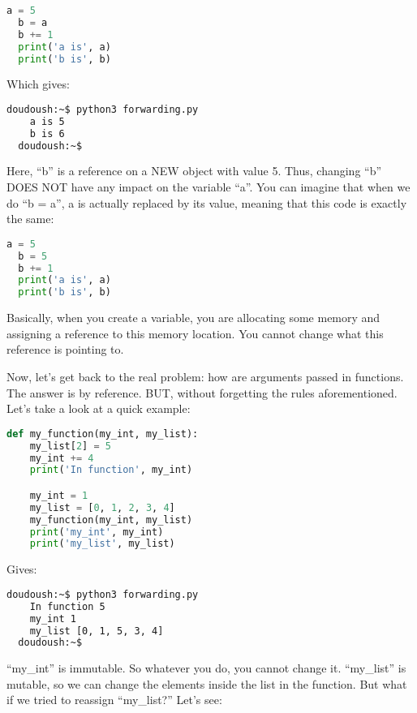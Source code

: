 \begin{lstlisting}[language=python]
  a = 5
  b = a
  b += 1
  print('a is', a)
  print('b is', b)
\end{lstlisting}

Which gives:

\begin{lstlisting}[language=bash]
  doudoush:~$ python3 forwarding.py
    a is 5
    b is 6
  doudoush:~$
\end{lstlisting}

Here, ``b'' is a reference on a NEW object with value 5. Thus, changing ``b'' DOES NOT have any impact
on the variable ``a''. You can imagine that when we do ``b = a'', a is actually replaced by its value,
meaning that this code is exactly the same:

\begin{lstlisting}[language=python]
  a = 5
  b = 5
  b += 1
  print('a is', a)
  print('b is', b)
\end{lstlisting}

Basically, when you create a variable, you are allocating some memory and assigning a reference
to this memory location. You cannot change what this reference is pointing to.

\vspace{5mm}
Now, let's get back to the real problem: how are arguments passed in functions. The answer is by reference.
BUT, without forgetting the rules aforementioned. Let's take a look at a quick example:

\begin{lstlisting}[language=python]
  def my_function(my_int, my_list):
    my_list[2] = 5
    my_int += 4
    print('In function', my_int)

    my_int = 1
    my_list = [0, 1, 2, 3, 4]
    my_function(my_int, my_list)
    print('my_int', my_int)
    print('my_list', my_list)
\end{lstlisting}

Gives:

\begin{lstlisting}[language=bash]
  doudoush:~$ python3 forwarding.py
    In function 5
    my_int 1
    my_list [0, 1, 5, 3, 4]
  doudoush:~$
\end{lstlisting}

``my\_int'' is immutable. So whatever you do, you cannot change it. ``my\_list'' is mutable,
so we can change the elements inside the list in the function. But what if we tried to
reassign ``my\_list?'' Let's see:

